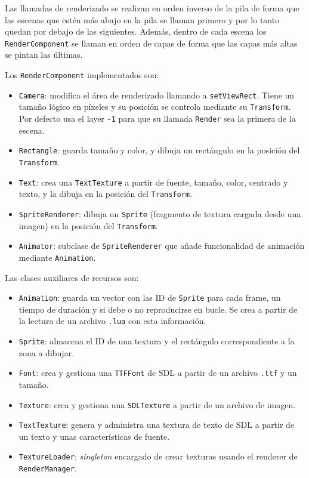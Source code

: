 \medskip

Las llamadas de renderizado se realizan en orden inverso de la pila de forma que las escenas que estén más abajo en la pila se llaman primero y por lo tanto quedan por debajo de las siguientes. Además, dentro de cada escena los \texttt{RenderComponent} se llaman en orden de capas de forma que las capas más altas se pintan las últimas. 

\medskip

Los \texttt{RenderComponent} implementados son: 

\begin{itemize}
	\item \texttt{Camera}: modifica el área de renderizado llamando a \texttt{setViewRect}. Tiene un tamaño lógico en píxeles y su posición se controla mediante su \texttt{Transform}. Por defecto usa el layer \texttt{-1} para que su llamada \texttt{Render} sea la primera de la escena.
	\item \texttt{Rectangle}: guarda tamaño y color, y dibuja un rectángulo en la posición del \texttt{Transform}. 
	\item \texttt{Text}: crea una \texttt{TextTexture} a partir de fuente, tamaño, color, centrado y texto, y la dibuja en la posición del \texttt{Transform}.
	\item \texttt{SpriteRenderer}: dibuja un \texttt{Sprite} (fragmento de textura cargada desde una imagen) en la posición del \texttt{Transform}. 
	\item \texttt{Animator}: subclase de \texttt{SpriteRenderer} que añade funcionalidad de animación mediante \texttt{Animation}. 
\end{itemize}

Las clases auxiliares de recursos son: 

\begin{itemize}
	\item \texttt{Animation}: guarda un vector con las ID de \texttt{Sprite} para cada frame, un tiempo de duración y si debe o no reproducirse en bucle. Se crea a partir de la lectura de un archivo \texttt{.lua} con esta información.
	\item \texttt{Sprite}: almacena el ID de una textura y el rectángulo correspondiente a la zona a dibujar. 
	\item \texttt{Font}: crea y gestiona una \texttt{TTFFont} de SDL a partir de un archivo \texttt{.ttf} y un tamaño. 
	\item \texttt{Texture}: crea y gestiona una \texttt{SDLTexture} a partir de un archivo de imagen.
	\item \texttt{TextTexture}: genera y administra una textura de texto de SDL a partir de un texto y unas características de fuente.
	\item \texttt{TextureLoader}: \textit{singleton} encargado de crear texturas usando el renderer de \texttt{RenderManager}.  
\end{itemize}

